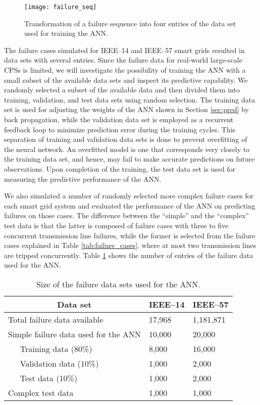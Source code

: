 \documentclass[12pt]{elsarticle}
\begin{document}
\begin{figure}
\centering
\texttt{[image: failure\_seq]}
\caption{Transformation of a failure sequence into four entries of the data set used for training the ANN.}
\label{fig:failure_seq}
\end{figure}

The failure cases simulated for IEEE--14 and IEEE--57 smart grids resulted in data sets with several entries. Since the failure data for real-world large-scale CPSs is limited, we will investigate the possibility of training the ANN with a small subset of the available data sets and inspect its predictive capability. We randomly selected a subset of the available data and then divided them into training, validation, and test data sets using random selection. The training data set is used for adjusting the weights of the ANN shown in Section \ref{sec:pred} by back propagation, while the validation data set is employed as a recurrent feedback loop to minimize prediction error during the training cycles. This separation of training and validation data sets is done to prevent overfitting of the neural network. An overfitted model is one that corresponds very closely to the training data set, and hence, may fail to make accurate predictions on future observations. Upon completion of the training, the test data set is used for measuring the predictive performance of the ANN.

We also simulated a number of randomly selected more complex failure cases for each smart grid system and evaluated the performance of the ANN on predicting failures on those cases. The difference between the ``simple'' and the ``complex'' test data is that the latter is composed of failure cases with three to five concurrent transmission line failures, while the former is selected from the failure cases explained in Table \ref{tab:failure_cases}, where at most two transmission lines are tripped concurrently. Table \ref{tab:nn_data} shows the number of entries of the failure data used for the ANN.

\begin{table}
\caption{Size of the failure data sets used for the ANN.}
\label{tab:nn_data}
\centering
\renewcommand{\arraystretch}{1.1}
\begin{tabular}{ll|l|l}
\multicolumn{2}{c|}{Data set}                              & IEEE--14 & IEEE--57  \\ \hline
\multicolumn{2}{l|}{Total failure data available}         & 17,968   & 1,181,871 \\
\multicolumn{2}{l|}{Simple failure data used for the ANN} & 10,000   & 20,000    \\
 & Training data (80\%)                                   & 8,000    & 16,000    \\
 & Validation data (10\%)                                 & 1,000    & 2,000     \\
 & Test data (10\%)                                       & 1,000    & 2,000     \\
\multicolumn{2}{l|}{Complex test data}                    & 1,000    & 1,000     \\
\end{tabular}
\end{table}
\end{document}
